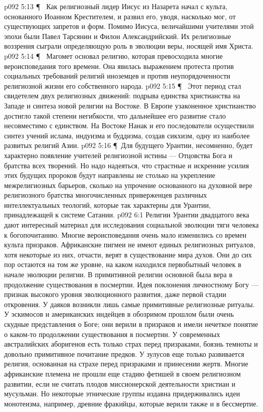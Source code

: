 \vs p092 5:13 \P\ \bibnobreakspace {} Как религиозный лидер Иисус из Назарета начал с культа, основанного Иоанном Крестителем, и развил его, уводя, насколько мог, от существующих запретов и форм. Помимо Иисуса, величайшими учителями этой эпохи были Павел Тарсянин и Филон Александрийский. Их религиозные воззрения сыграли определяющую роль в эволюции веры, носящей имя Христа.
\vs p092 5:14 \P\ \bibnobreakspace {} Магомет основал религию, которая превосходила многие вероисповедания того времени. Она явилась выражением протеста против социальных требований религий иноземцев и против неупорядоченности религиозной жизни его собственного народа.
\vs p092 5:15 \P\ \bibnobreakspace {} Этот период стал свидетелем двух религиозных движений: подрыва единства христианства на Западе и синтеза новой религии на Востоке. В Европе узаконенное христианство достигло такой степени негибкости, что дальнейшее его развитие стало несовместимо с единством. На Востоке Нанак и его последователи осуществили синтез учений ислама, индуизма и буддизма, создав сикхизм, одну из наиболее развитых религий Азии.
\vs p092 5:16 \P\ Для будущего Урантии, несомненно, будет характерно появление учителей религиозной истины --- Отцовства Бога и братства всех творений. Но надо надеяться, что страстные и искренние усилия этих будущих пророков будут направлены не столько на укрепление межрелигиозных барьеров, сколько на упрочение основанного на духовной вере религиозного братства многочисленных приверженцев различных интеллектуальных теологий, которые так характерны для Урантии, принадлежащей к системе Сатании.
\vs p092 6:1 Религии Урантии двадцатого века дают интересный материал для исследования социальной эволюции тяги человека к богопочитанию. Многие вероисповедания очень мало изменились со времен культа призраков. Африканские пигмеи не имеют единых религиозных ритуалов, хотя некоторые из них, отчасти, верят в существование мира духов. Они до сих пор остаются на том же уровне, на каком находился первобытный человек в начале эволюции религии. В примитивной религии основной была вера в продолжение существования в посмертии. Идея поклонения личностному Богу --- признак высокого уровня эволюционного развития, даже первой стадии откровения. У даяков возникли лишь самые примитивные религиозные ритуалы. У эскимосов и американских индейцев в обозримом прошлом были очень скудные представления о Боге; они верили в призраков и имели нечеткое понятие о каком\hyp{}то продолжении существования в посмертии. У современных австралийских аборигенов есть только страх перед призраками, боязнь темноты и довольно примитивное почитание предков. У зулусов еще только развивается религия, основанная на страхе перед призраками и принесении жертв. Многие африканские племена не прошли еще стадию фетишей в своем религиозном развитии, если не считать плодов миссионерской деятельности христиан и мусульман. Но некоторые этнические группы издавна придерживались идеи монотеизма, например, древние фракийцы, которые верили также и в бессмертие.
